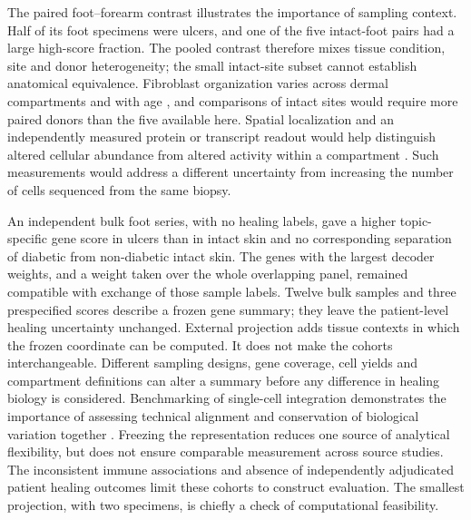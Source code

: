 The paired foot--forearm contrast illustrates the importance of sampling context. Half of its foot specimens were ulcers, and one of the five intact-foot pairs had a large high-score fraction. The pooled contrast therefore mixes tissue condition, site and donor heterogeneity; the small intact-site subset cannot establish anatomical equivalence. Fibroblast organization varies across dermal compartments and with age \citep{driskell2013,soleboldo2020}, and comparisons of intact sites would require more paired donors than the five available here. Spatial localization and an independently measured protein or transcript readout would help distinguish altered cellular abundance from altered activity within a compartment \citep{foster2021,kotliar2019}. Such measurements would address a different uncertainty from increasing the number of cells sequenced from the same biopsy.

An independent bulk foot series, with no healing labels, gave a higher topic-specific gene score in ulcers than in intact skin and no corresponding separation of diabetic from non-diabetic intact skin. The genes with the largest decoder weights, and a weight taken over the whole overlapping panel, remained compatible with exchange of those sample labels. Twelve bulk samples and three prespecified scores describe a frozen gene summary; they leave the patient-level healing uncertainty unchanged. External projection adds tissue contexts in which the frozen coordinate can be computed. It does not make the cohorts interchangeable. Different sampling designs, gene coverage, cell yields and compartment definitions can alter a summary before any difference in healing biology is considered. Benchmarking of single-cell integration demonstrates the importance of assessing technical alignment and conservation of biological variation together \citep{luecken2022}. Freezing the representation reduces one source of analytical flexibility, but does not ensure comparable measurement across source studies. The inconsistent immune associations and absence of independently adjudicated patient healing outcomes limit these cohorts to construct evaluation. The smallest projection, with two specimens, is chiefly a check of computational feasibility.

